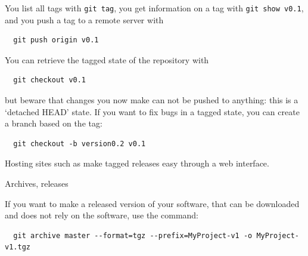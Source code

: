 You list all tags with \lstinline{git tag},
you get information on a tag with \lstinline{git show v0.1},
and you push a tag to a remote server with
\begin{lstlisting}
  git push origin v0.1
\end{lstlisting}

You can retrieve the tagged state of the repository with
\begin{lstlisting}
  git checkout v0.1
\end{lstlisting}
but beware that changes you now make can not be pushed to anything:
this is a `detached HEAD' state.
If you want to fix bugs in a tagged state,
you can create a branch based on the tag:
\begin{lstlisting}
  git checkout -b version0.2 v0.1
\end{lstlisting}

\begin{remark}
  Hosting sites such as  make
  tagged releases easy through a web interface.
\end{remark}

 {Archives, releases}


If you want to make a released version of your software,
that can be downloaded and does not rely on the  software,
use the  command:
\begin{lstlisting}
  git archive master --format=tgz --prefix=MyProject-v1 -o MyProject-v1.tgz
\end{lstlisting}

\endinput

\Level 0 {Conflicts}

\begin{purpose}
  In this section you will learn about how do deal with conflicting
  edits by two users of the same repository.
\end{purpose}

